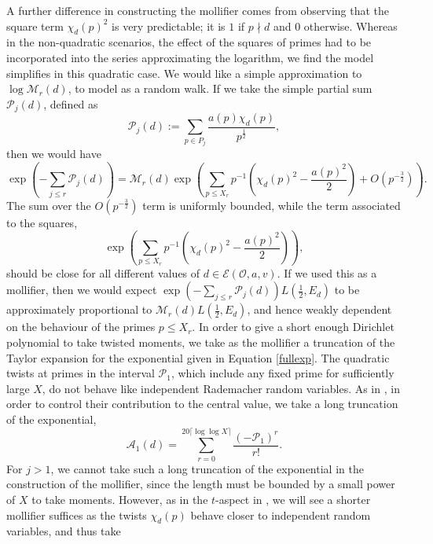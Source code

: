 \documentclass[12pt]{amsart}
\numberwithin{equation}{section}
\numberwithin{thm}{section}
\newcommand{\1}{\mathbf 1}
\begin{document}
A further difference in constructing the mollifier comes from observing that the square term $\chi_d(p)^2$ is very predictable; it is $1$ if $p\nmid d$ and $0$ otherwise. Whereas in the non-quadratic scenarios, the effect of the squares of primes had to be incorporated into the series approximating the logarithm, we find the model simplifies in this quadratic case. We would like a simple approximation to $\log  \mathcal{M}_r(d)$, to model as a random walk. If we take the simple partial sum $\mathscr{P}_j(d)$, defined as
\begin{equation}\label{defpj}\mathscr{P}_j(d):=\sum_{p\in P_j} \frac{a(p)\chi_d(p)}{p^{\frac{1}{2}}},\end{equation} then we would have
\begin{equation}\label{fullexp}
\exp\left(-\sum_{j\le r}\mathscr{P}_j(d)\right)=\mathcal{M}_r(d) \exp\left(\sum_{p\le X_r} p^{-1} \left(\chi_d(p)^2-\frac{a(p)^2}{2}\right)+O(p^{-\frac{3}{2}})\right).  
\end{equation} 
The sum over the $O(p^{-\frac{3}{2}})$   term is uniformly bounded, while the 
term associated to the squares, $$\exp\left(\sum_{p\le X_r} p^{-1} \left(\chi_d(p)^2-\frac{a(p)^2}{2}\right)\right),$$ should be close for all different values of $d\in \mathcal{E}(\mathscr{O},a,v).$ If we used this as a mollifier, then we would expect $\exp\left(-\sum_{j\le r} \mathscr{P}_j(d)\right)L\left(\frac{1}{2},E_d\right)$ to be approximately proportional to $ \mathcal{M}_r(d)L\left(\frac{1}{2},E_d\right) $, and hence weakly dependent on the behaviour of the primes $p\le X_r$.
In order to give a short enough Dirichlet polynomial to take twisted moments, we take as the mollifier a truncation of the Taylor expansion for the exponential given in Equation \eqref{fullexp}.
The quadratic twists at primes in the interval $\mathscr{P}_1$, which include any fixed prime for sufficiently large $X$, do not behave like independent Rademacher random variables. As in \cite{RS2}, in order to control their contribution to the central value, we take a long truncation of the exponential, 
\begin{equation}\label{A1}
	\mathscr{A}_1(d)=\sum^{20\lceil \log\log X\rceil}_{r=0} \frac{(-\mathscr{P}_1)^r}{r!}.
\end{equation}
For $j>1$, we cannot take such a long truncation of the exponential in the construction of the mollifier, since the length must be  bounded by a small power of $X$ to take moments. However, as in the $t$-aspect in \cite{AB}, we will see a shorter mollifier suffices as the twists $\chi_d(p)$ behave closer to independent random variables, and thus take
\end{document}

